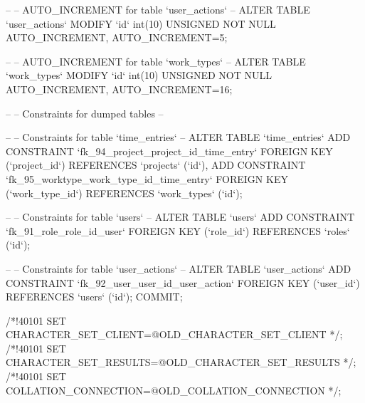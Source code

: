 \documentclass{article}
\begin{document}
--
-- AUTO_INCREMENT for table `user_actions`
--
ALTER TABLE `user_actions`
  MODIFY `id` int(10) UNSIGNED NOT NULL AUTO_INCREMENT, AUTO_INCREMENT=5;

--
-- AUTO_INCREMENT for table `work_types`
--
ALTER TABLE `work_types`
  MODIFY `id` int(10) UNSIGNED NOT NULL AUTO_INCREMENT, AUTO_INCREMENT=16;

--
-- Constraints for dumped tables
--

--
-- Constraints for table `time_entries`
--
ALTER TABLE `time_entries`
  ADD CONSTRAINT `fk_94_project_project_id_time_entry` FOREIGN KEY (`project_id`) REFERENCES `projects` (`id`),
  ADD CONSTRAINT `fk_95_worktype_work_type_id_time_entry` FOREIGN KEY (`work_type_id`) REFERENCES `work_types` (`id`);

--
-- Constraints for table `users`
--
ALTER TABLE `users`
  ADD CONSTRAINT `fk_91_role_role_id_user` FOREIGN KEY (`role_id`) REFERENCES `roles` (`id`);

--
-- Constraints for table `user_actions`
--
ALTER TABLE `user_actions`
  ADD CONSTRAINT `fk_92_user_user_id_user_action` FOREIGN KEY (`user_id`) REFERENCES `users` (`id`);
COMMIT;

/*!40101 SET CHARACTER_SET_CLIENT=@OLD_CHARACTER_SET_CLIENT */;
/*!40101 SET CHARACTER_SET_RESULTS=@OLD_CHARACTER_SET_RESULTS */;
/*!40101 SET COLLATION_CONNECTION=@OLD_COLLATION_CONNECTION */;
\end{document}
